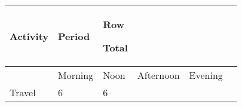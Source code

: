 \documentclass[]{book}
\begin{document}
\begin{longtable}[]{@{}llllll@{}}
\toprule
\begin{minipage}[b]{0.17\columnwidth}\raggedright
Activity\strut
\end{minipage} & \begin{minipage}[b]{0.12\columnwidth}\raggedright
Period\strut
\end{minipage} & \begin{minipage}[b]{0.09\columnwidth}\raggedright
Row

Total\strut
\end{minipage} & \begin{minipage}[b]{0.14\columnwidth}\raggedright
\strut
\end{minipage} & \begin{minipage}[b]{0.12\columnwidth}\raggedright
\strut
\end{minipage} & \begin{minipage}[b]{0.07\columnwidth}\raggedright
\strut
\end{minipage}\tabularnewline
\midrule
\endhead
\begin{minipage}[t]{0.17\columnwidth}\raggedright
\strut
\end{minipage} & \begin{minipage}[t]{0.12\columnwidth}\raggedright
Morning\strut
\end{minipage} & \begin{minipage}[t]{0.09\columnwidth}\raggedright
Noon\strut
\end{minipage} & \begin{minipage}[t]{0.14\columnwidth}\raggedright
Afternoon\strut
\end{minipage} & \begin{minipage}[t]{0.12\columnwidth}\raggedright
Evening\strut
\end{minipage} & \begin{minipage}[t]{0.07\columnwidth}\raggedright
\strut
\end{minipage}\tabularnewline
\begin{minipage}[t]{0.17\columnwidth}\raggedright
Travel\strut
\end{minipage} & \begin{minipage}[t]{0.12\columnwidth}\raggedright
6\strut
\end{minipage} & \begin{minipage}[t]{0.09\columnwidth}\raggedright
6\strut
\end{minipage} & \begin{minipage}[t]{0.14\columnwidth}\raggedright

\end{minipage}
\end{longtable}
\end{document}
